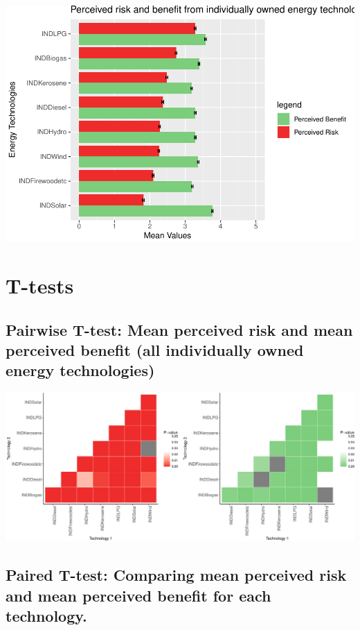 \documentclass[
]{article}
\begin{document}
\includegraphics{LPGversusFirewood_files/figure-latex/unnamed-chunk-7-1.pdf}

\newpage

\hypertarget{t-tests}{%
\section{T-tests}\label{t-tests}}

\hypertarget{pairwise-t-test-mean-perceived-risk-and-mean-perceived-benefit-all-individually-owned-energy-technologies}{%
\subsection{Pairwise T-test: Mean perceived risk and mean perceived
benefit (all individually owned energy
technologies)}\label{pairwise-t-test-mean-perceived-risk-and-mean-perceived-benefit-all-individually-owned-energy-technologies}}

\includegraphics{LPGversusFirewood_files/figure-latex/unnamed-chunk-8-1.pdf}

\hypertarget{paired-t-test-comparing-mean-perceived-risk-and-mean-perceived-benefit-for-each-technology.}{%
\subsection{Paired T-test: Comparing mean perceived risk and mean
perceived benefit for each
technology.}\label{paired-t-test-comparing-mean-perceived-risk-and-mean-perceived-benefit-for-each-technology.}}
\end{document}

